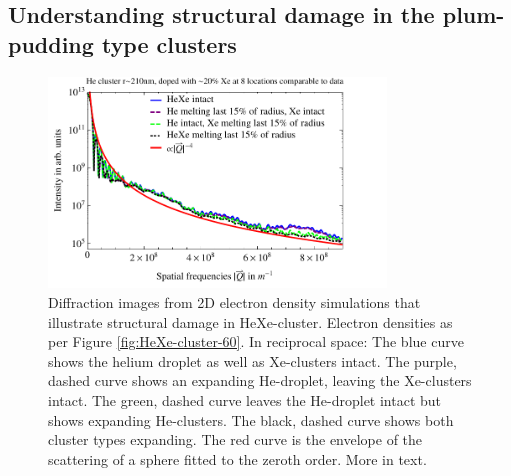\subsection{Understanding structural damage in the plum-pudding type clusters}\label{sec:helium-xenon-data}
\begin{figure}
	\centering
		\includegraphics[width=0.8\textwidth]{images/results/simulations-damage-explain2.pdf}
	\caption[Simulated structural damage scenarios in HeXe-clusters.]{Diffraction images from 2D electron density simulations that illustrate structural damage in HeXe-cluster. Electron densities as per Figure \ref{fig:HeXe-cluster-60}. In reciprocal space: The blue curve shows the helium droplet as well as Xe-clusters intact. The purple, dashed curve shows an expanding He-droplet, leaving the Xe-clusters intact. The green, dashed curve leaves the He-droplet intact but shows expanding He-clusters. The black, dashed curve shows both cluster types expanding. The red curve is the envelope of the scattering of a sphere fitted to the zeroth order. More in text.}
	\label{fig:simulations-damage-explain}
\end{figure}
